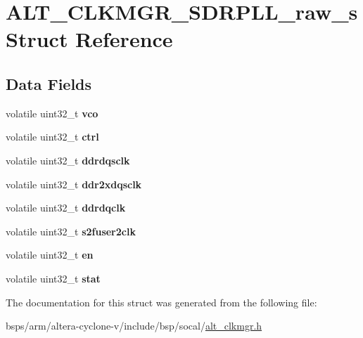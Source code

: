 \hypertarget{structALT__CLKMGR__SDRPLL__raw__s}{}\section{A\+L\+T\+\_\+\+C\+L\+K\+M\+G\+R\+\_\+\+S\+D\+R\+P\+L\+L\+\_\+raw\+\_\+s Struct Reference}
\label{structALT__CLKMGR__SDRPLL__raw__s}
\subsection*{Data Fields}
\begin{DoxyCompactItemize}
\item 
\mbox{\label{structALT__CLKMGR__SDRPLL__raw__s_abe54fe0eec4b92f98cf287f4529a72f8}} 
volatile uint32\+\_\+t {\bfseries vco}
\item 
\mbox{\label{structALT__CLKMGR__SDRPLL__raw__s_a8e0a634dd2f140fd044b1577d9d27744}} 
volatile uint32\+\_\+t {\bfseries ctrl}
\item 
\mbox{\label{structALT__CLKMGR__SDRPLL__raw__s_a68bf5ac4db97be7ee9b23c41585e4c0c}} 
volatile uint32\+\_\+t {\bfseries ddrdqsclk}
\item 
\mbox{\label{structALT__CLKMGR__SDRPLL__raw__s_a82916986eb2d66f73610e52f7e423682}} 
volatile uint32\+\_\+t {\bfseries ddr2xdqsclk}
\item 
\mbox{\label{structALT__CLKMGR__SDRPLL__raw__s_ac37f0d8859bc00634d59a95f823ebbc2}} 
volatile uint32\+\_\+t {\bfseries ddrdqclk}
\item 
\mbox{\label{structALT__CLKMGR__SDRPLL__raw__s_ac217cd09ecc805269dbfb9e4d198fbf8}} 
volatile uint32\+\_\+t {\bfseries s2fuser2clk}
\item 
\mbox{\label{structALT__CLKMGR__SDRPLL__raw__s_a6ff7916859e453c9d7cafc41401c8a7c}} 
volatile uint32\+\_\+t {\bfseries en}
\item 
\mbox{\label{structALT__CLKMGR__SDRPLL__raw__s_a5d2a40766d3c66c157e04df2b2d8b6e5}} 
volatile uint32\+\_\+t {\bfseries stat}
\end{DoxyCompactItemize}


The documentation for this struct was generated from the following file\+:\begin{DoxyCompactItemize}
\item 
bsps/arm/altera-\/cyclone-\/v/include/bsp/socal/\mbox{\hyperlink{alt__clkmgr_8h}{alt\+\_\+clkmgr.\+h}}\end{DoxyCompactItemize}
